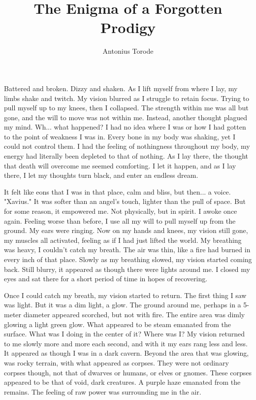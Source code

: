 \documentclass[11pt]{article}
\title{The Enigma of a Forgotten Prodigy}
\author{Antonius Torode}
\begin{document}
\maketitle
\thispagestyle{fancy}

Battered and broken. Dizzy and shaken. As I lift myself from where I lay, my limbs shake and twitch. My vision blurred as I struggle to retain focus. Trying to pull myself up to my knees, then I collapsed. The strength within me was all but gone, and the will to move was not within me. Instead, another thought plagued my mind. Wh... what happened? I had no idea where I was or how I had gotten to the point of weakness I was in. Every bone in my body was shaking, yet I could not control them. I had the feeling of nothingness throughout my body, my energy had literally been depleted to that of nothing. As I lay there, the thought that death will overcome me seemed comforting. I let it happen, and as I lay there, I let my thoughts turn black, and enter an endless dream. 

It felt like eons that I was in that place, calm and bliss, but then... a voice. "Xavius." It was softer than an angel’s touch, lighter than the pull of space. But for some reason, it empowered me. Not physically, but in spirit. I awoke once again. Feeling worse than before, I use all my will to pull myself up from the ground. My ears were ringing. Now on my hands and knees, my vision still gone, my muscles all activated, feeling as if I had just lifted the world. My breathing was heavy, I couldn't catch my breath. The air was thin, like a fire had burned in every inch of that place. Slowly as my breathing slowed, my vision started coming back. Still blurry, it appeared as though there were lights around me. I closed my eyes and sat there for a short period of time in hopes of recovering.

Once I could catch my breath, my vision started to return. The first thing I saw was light. But it was a dim light, a glow. The ground around me, perhaps in a 5-meter diameter appeared scorched, but not with fire. The entire area was dimly glowing a light green glow. What appeared to be steam emanated from the surface. What was I doing in the center of it? Where was I? My vision returned to me slowly more and more each second, and with it my ears rang less and less. It appeared as though I was in a dark cavern. Beyond the area that was glowing, was rocky terrain, with what appeared as corpses. They were not ordinary corpses though, not that of dwarves or humans, or elves or gnomes. These corpses appeared to be that of void, dark creatures. A purple haze emanated from the remains. The feeling of raw power was surrounding me in the air.
\end{document}
